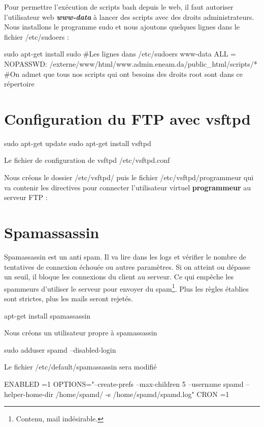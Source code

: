 \documentclass[a4paper,12pt,french]{report} %
\begin{document}
Pour permettre l'exécution de scripts bash depuis le web, il faut autoriser l'utilisateur web \emph{\textbf{www-data}} à lancer des scripts avec des droits administrateurs. Nous installons le programme sudo et nous ajoutons quelques lignes dans le fichier /etc/sudoers :
\begin{exempleConsole}
sudo apt-get install sudo 
#Les lignes dans /etc/sudoers
www-data ALL = NOPASSWD: /externe/www/html/www.admin.eneam.da/public_html/scripts/*
#On admet que tous nos scripts qui ont besoins des droits root sont dans ce répertoire	
\end{exempleConsole}

\section{Configuration du FTP  avec vsftpd}
\begin{exempleConsole}
sudo apt-get update
sudo apt-get install vsftpd
\end{exempleConsole}

Le fichier de configuration de vsftpd /etc/vsftpd.conf

Nous créons le dossier /etc/vsftpd/ puis le fichier /etc/vsftpd/programmeur qui va contenir les directives pour connecter l'utilisateur virtuel \textbf{programmeur} au serveur FTP :
\section{Spamassassin}
Spamassassin est un anti spam. Il va lire dans les logs et vérifier le nombre de tentatives de connexion échouée ou autres paramètres. Si on atteint ou dépasse un seuil, il bloque les connexions du client au serveur. Ce qui empêche les spammeurs d'utiliser le serveur pour envoyer du spam\footnote{Contenu, mail indésirable.}. Plus les règles établies sont strictes, plus les mails seront rejetés. 
\begin{exempleConsole}
apt-get install spamassassin
\end{exempleConsole}

Nous créons un utilisateur propre à spamassassin
\begin{exempleConsole}
sudo adduser spamd --disabled-login
\end{exempleConsole}

Le fichier /etc/default/spamassassin sera modifié
\begin{exempleConsole}
ENABLED =1
OPTIONS="--create-prefs --max-children 5 --username spamd --helper-home-dir /home/spamd/ -s /home/spamd/spamd.log"
CRON =1
\end{exempleConsole}
\end{document}
